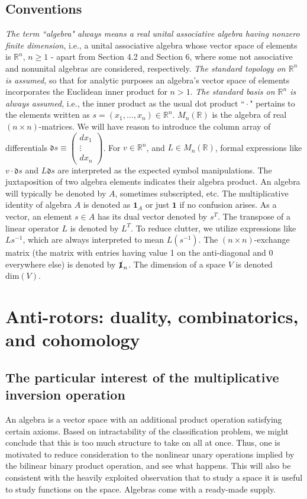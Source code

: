 \documentclass{amsart}
\numberwithin{equation}{section}
\theoremstyle{definition}
\numberwithin{theorem}{section}
\begin{document}
 \subsection{Conventions}  
 {\em The term {\rm ``algebra"} always means a real unital associative algebra having nonzero finite dimension}, i.e., a unital associative algebra whose vector space of elements is $\mathbb{R}^n$, $n\ge 1$ - apart from Section 4.2 and Section 6, where some not associative and nonunital algebras are considered, respectively.  {\it The standard topology on $\mathbb{R}^n$ is assumed}, so that for analytic purposes an algebra's vector space of elements incorporates the Euclidean inner product for $n>1$.  {\it The standard basis on $\mathbb{R}^n$ is always assumed}, i.e., the inner product as the usual dot product ``\,$\cdot$\," pertains to the elements written as $s=(x_1,\dots,x_n)\in\mathbb{R}^n$.  $M_n(\mathbb{R})$ is the algebra of real $(n\times n)$-matrices.  We will have reason to introduce the column array of differentials $\mathfrak{d}s \equiv \left(\begin{array}{ccc}
dx_1   \\ 
\vdots \\
dx_n   
\end{array}\right)$.  For $v\in\mathbb{R}^n$, and $L\in M_n(\mathbb{R})$, formal expressions like $v\cdot \mathfrak{d}s$ and $L\mathfrak{d}s$ are interpreted as the expected symbol manipulations.   The juxtaposition of two algebra elements indicates their algebra product.  An algebra will typically be denoted by $A$, sometimes subscripted, etc. The multiplicative identity of algebra $A$ is denoted as $\mathbf{1}_A$ or just $\mathbf{1}$ if no confusion arises.   As a vector, an element $s\in A$ has its dual vector denoted by $s^T$. The transpose of a linear operator $L$ is denoted by $L^T$.  To reduce clutter, we utilize expressions like $Ls^{-1}$, which are always interpreted to mean $L(s^{-1})$.  The $(n\times n)$-exchange matrix (the matrix with entries having value 1 on the anti-diagonal and 0 everywhere else) is denoted by  $\slashed{\bf 1}_n$.  The dimension of a space $V$ is denoted $\text{dim}(V)$.
 


 \section{Anti-rotors: duality, combinatorics, and cohomology} 

 \subsection{The particular interest of the multiplicative inversion operation} An algebra is a vector space with an additional product operation satisfying certain axioms.  Based on intractability of the classification problem, we might conclude that this is too much structure to take on all at once.  Thus, one is motivated to reduce consideration to the nonlinear unary operations implied by the bilinear binary product operation, and see what happens.  This will also be consistent with the heavily exploited observation that to study a space it is useful to study functions on the space.  Algebras come with a ready-made supply.
 
\end{document}
